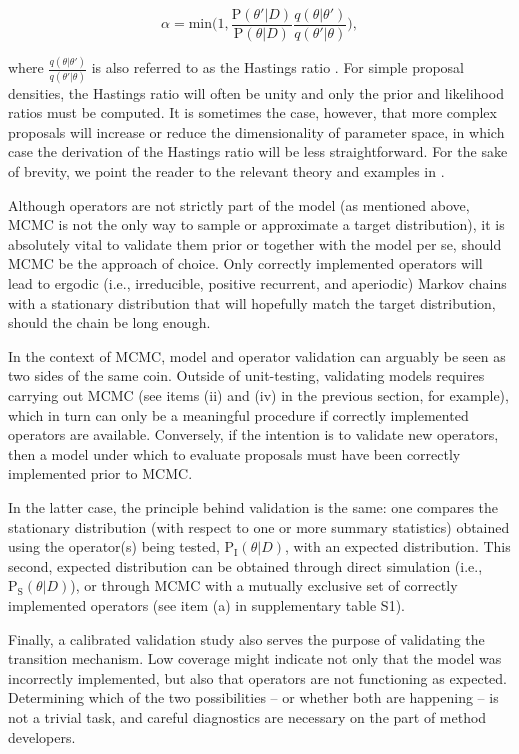 \documentclass[oneside]{article}
\begin{document}
\begin{equation}
  \alpha = \text{min}\bigg(1, \frac{\text{P}(\theta'|D)}{\text{P}(\theta|D)} \frac{q(\theta|\theta')}{q(\theta'|\theta)} \bigg),
\end{equation}

\noindent where $\frac{q(\theta|\theta')}{q(\theta'|\theta)}$ is also
referred to as the Hastings ratio \citep{smith93,tierney94,gelman}.
For simple proposal densities, the Hastings ratio will often be unity and
only the prior and likelihood ratios must be computed.
It is sometimes the case, however, that more complex proposals will
increase or reduce the dimensionality of parameter space, in which
case the derivation of the Hastings ratio will be less straightforward.
For the sake of brevity, we point the reader to the relevant theory
and examples in \citep{green95,huelsenbeck04,drummond10}.

Although operators are not strictly part of the model (as mentioned
above, MCMC is not the only way to sample or approximate a target
distribution), it is absolutely vital to validate them prior or
together with the model per se, should MCMC be the approach of choice.
Only correctly implemented operators will lead to ergodic (i.e.,
irreducible, positive recurrent, and aperiodic) Markov
chains with a stationary distribution that will hopefully match
the target distribution, should the chain be long enough.

In the context of MCMC, model and operator validation can arguably be
seen as two sides of the same coin.
Outside of unit-testing, validating models requires carrying out MCMC
(see items (ii) and (iv) in the previous section, for example), which
in turn can only be a meaningful procedure if correctly implemented
operators are available.
Conversely, if the intention is to validate new operators, then a
model under which to evaluate proposals must have been correctly
implemented prior to MCMC.

In the latter case, the principle behind validation is the same: one
compares the stationary distribution (with respect to one or more summary
statistics) obtained using the operator(s)
being tested, $\text{P}_{\text{I}}(\theta|D)$, with an expected
distribution.
This second, expected distribution can be obtained through direct
simulation (i.e., $\text{P}_{\text{S}}(\theta|D)$), or through MCMC
with a mutually exclusive set of correctly implemented operators (see
item (a) in supplementary table S1).

Finally, a calibrated validation study also serves the purpose of
validating the transition mechanism.
Low coverage might indicate not only that the model was incorrectly
implemented, but also that operators are not functioning as expected.
Determining which of the two possibilities -- or whether both are
happening -- is not a trivial task, and careful diagnostics are
necessary on the part of method developers.
\end{document}
